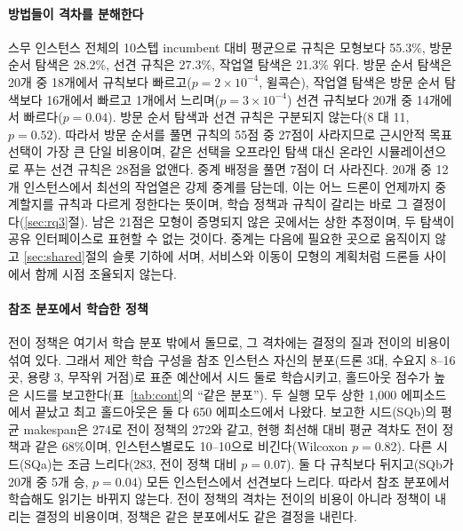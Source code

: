 \documentclass[final,5p,times,twocolumn]{elsarticle}
\begin{document}
\paragraph{방법들이 격차를 분해한다}
스무 인스턴스 전체의 10스텝 incumbent 대비 평균으로 규칙은 모형보다 55.3\%, 방문 순서 탐색은 28.2\%,
선견 규칙은 27.3\%, 작업열 탐색은 21.3\% 위다. 방문 순서 탐색은 20개 중 18개에서 규칙보다 빠르고($p = 2
\times 10^{-4}$, 윌콕슨), 작업열 탐색은 방문 순서 탐색보다 16개에서 빠르고 1개에서 느리며($p = 3 \times
10^{-4}$) 선견 규칙보다 20개 중 14개에서 빠르다($p = 0.04$). 방문 순서 탐색과 선견 규칙은 구분되지 않는다(8
대 11, $p = 0.52$). 따라서 방문 순서를 풀면 규칙의 55점 중 27점이 사라지므로 근시안적 목표 선택이 가장 큰
단일 비용이며, 같은 선택을 오프라인 탐색 대신 온라인 시뮬레이션으로 푸는 선견 규칙은 28점을 없앤다.
중계 배정을 풀면 7점이 더 사라진다. 20개 중 12개 인스턴스에서 최선의 작업열은 강제 중계를 담는데, 이는
어느 드론이 언제까지 중계할지를 규칙과 다르게 정한다는 뜻이며, 학습 정책과 규칙이 갈리는 바로 그
결정이다(\ref{sec:rq3}절). 남은 21점은 모형이 증명되지 않은 곳에서는 상한 추정이며, 두 탐색이 공유
인터페이스로 표현할 수 없는 것이다. 중계는 다음에 필요한 곳으로 움직이지 않고 \ref{sec:shared}절의 슬롯
기하에 서며, 서비스와 이동이 모형의 계획처럼 드론들 사이에서 함께 시점 조율되지 않는다.

\paragraph{참조 분포에서 학습한 정책}
전이 정책은 여기서 학습 분포 밖에서 돌므로, 그 격차에는 결정의 질과 전이의 비용이 섞여 있다. 그래서
제안 학습 구성을 참조 인스턴스 자신의 분포(드론 3대, 수요지 8--16곳, 용량 3, 무작위 거점)로 표준
예산에서 시드 둘로 학습시키고, 홀드아웃 점수가 높은 시드를 보고한다(표~\ref{tab:cont}의 ``같은
분포''). 두 실행 모두 상한 1,000 에피소드에서 끝났고 최고 홀드아웃은 둘 다 650 에피소드에서
나왔다. 보고한 시드(SQb)의 평균 makespan은 274로 전이 정책의 272와 같고, 현행 최선해 대비 평균 격차도
전이 정책과 같은 68\%이며, 인스턴스별로도 10--10으로 비긴다(Wilcoxon $p=0.82$). 다른 시드(SQa)는
조금 느리다(283, 전이 정책 대비 $p=0.07$). 둘 다 규칙보다 뒤지고(SQb가 20개 중 5개 승, $p=0.04$)
모든 인스턴스에서 선견보다 느리다. 따라서 참조 분포에서 학습해도 읽기는 바뀌지 않는다. 전이 정책의
격차는 전이의 비용이 아니라 정책이 내리는 결정의 비용이며, 정책은 같은 분포에서도 같은 결정을 내린다.
\end{document}
